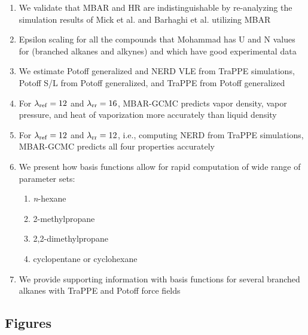 \documentclass[journal=jced,manuscript=article]{achemso}
\begin{document}
\begin{enumerate}
	\item We validate that MBAR and HR are indistinguishable by re-analyzing the simulation results of Mick et al. and Barhaghi et al. utilizing MBAR
	\item Epsilon scaling for all the compounds that Mohammad has U and N values for (branched alkanes and alkynes) and which have good experimental data
	\item We estimate Potoff generalized and NERD VLE from TraPPE simulations, Potoff S/L from Potoff generalized, and TraPPE from Potoff generalized
	\item For $\lambda_{\rm ref} = 12$ and $\lambda_{\rm rr} = 16$, MBAR-GCMC predicts vapor density, vapor pressure, and heat of vaporization more accurately than liquid density
	\item For $\lambda_{\rm ref} = 12$ and $\lambda_{\rm rr} = 12$, i.e., computing NERD from TraPPE simulations, MBAR-GCMC predicts all four properties accurately    
	\item We present how basis functions allow for rapid computation of wide range of parameter sets:
	\begin{enumerate}
		\item \textit{n}-hexane
		\item 2-methylpropane
		\item 2,2-dimethylpropane
		\item cyclopentane or cyclohexane
	\end{enumerate}
	\item We provide supporting information with basis functions for several branched alkanes with TraPPE and Potoff force fields
\end{enumerate}

\subsection{Figures}
\end{document}
